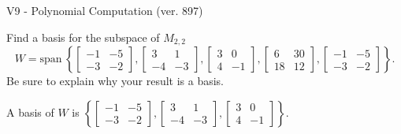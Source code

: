 \begin{exercise}
  \begin{exerciseTitle}V9 - Polynomial Computation (ver. 897)\end{exerciseTitle}
  \begin{exerciseStatement}
    Find a basis for the subspace of \(M_{2,2}\) 
\[W=\mathrm{span}\ \left\{\left[\begin{array}{cc}
-1 & -5 \\
-3 & -2
\end{array}\right] , \left[\begin{array}{cc}
3 & 1 \\
-4 & -3
\end{array}\right] , \left[\begin{array}{cc}
3 & 0 \\
4 & -1
\end{array}\right] , \left[\begin{array}{cc}
6 & 30 \\
18 & 12
\end{array}\right] , \left[\begin{array}{cc}
-1 & -5 \\
-3 & -2
\end{array}\right]\right\}.\]
 Be sure to explain why your result is a basis.


  \end{exerciseStatement}
  \begin{exerciseAnswer}
   A basis of \(W\) is  \(\left\{\left[\begin{array}{cc}
-1 & -5 \\
-3 & -2
\end{array}\right] , \left[\begin{array}{cc}
3 & 1 \\
-4 & -3
\end{array}\right] , \left[\begin{array}{cc}
3 & 0 \\
4 & -1
\end{array}\right]\right\}\).
  


  \end{exerciseAnswer}
\end{exercise}
